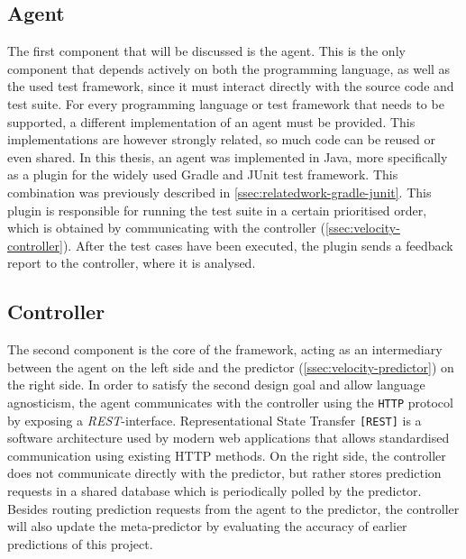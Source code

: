 \subsection{Agent}\label{ssec:velocity-frontend}
The first component that will be discussed is the agent. This is the only component that depends actively on both the programming language, as well as the used test framework, since it must interact directly with the source code and test suite. For every programming language or test framework that needs to be supported, a different implementation of an agent must be provided. This implementations are however strongly related, so much code can be reused or even shared. In this thesis, an agent was implemented in Java, more specifically as a plugin for the widely used Gradle and JUnit test framework. This combination was previously described in \autoref{ssec:relatedwork-gradle-junit}. This plugin is responsible for running the test suite in a certain prioritised order, which is obtained by communicating with the controller (\autoref{ssec:velocity-controller}). After the test cases have been executed, the plugin sends a feedback report to the controller, where it is analysed.

\subsection{Controller}\label{ssec:velocity-controller}
The second component is the core of the framework, acting as an intermediary between the agent on the left side and the predictor (\autoref{ssec:velocity-predictor}) on the right side. In order to satisfy the second design goal and allow language agnosticism, the agent communicates with the controller using the \texttt{HTTP} protocol by exposing a \emph{REST}-interface. Representational State Transfer \texttt{[REST]} is a software architecture used by modern web applications that allows standardised communication using existing HTTP methods. On the right side, the controller does not communicate directly with the predictor, but rather stores prediction requests in a shared database which is periodically polled by the predictor. Besides routing prediction requests from the agent to the predictor, the controller  will also update the meta-predictor by evaluating the accuracy of earlier predictions of this project.

